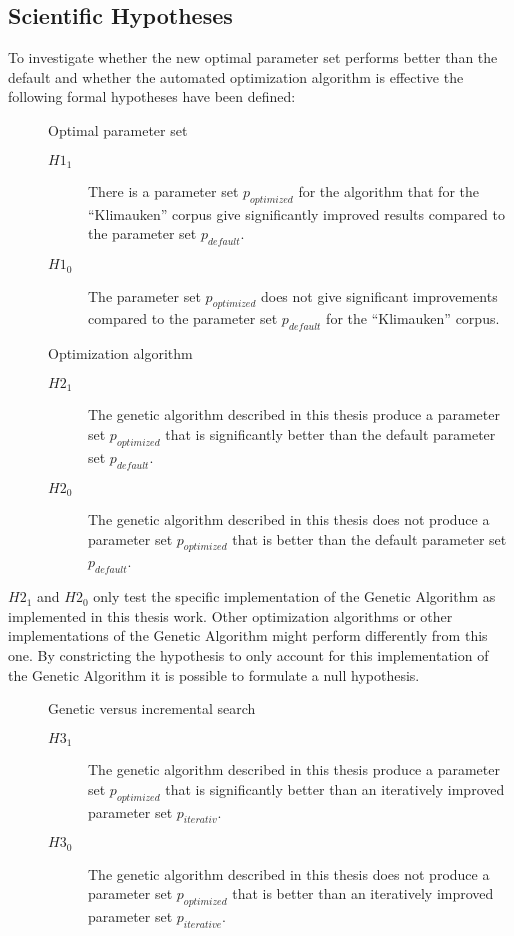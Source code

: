 \subsection{Scientific Hypotheses}

To investigate whether the new optimal parameter set performs better than the default and whether the automated optimization algorithm is effective the following formal hypotheses have been defined:


\begin{description}
	\item []Optimal parameter set
	\begin{description}
	\item [\(H1_{1}\)] There is a parameter set \(p_{optimized}\) for the \CTC algorithm that for the ``Klimauken'' corpus give significantly improved results compared to the parameter set \(p_{default}\).
	\item [\(H1_{0}\)] The parameter set \(p_{optimized}\) does not give significant improvements compared to the parameter set \(p_{default}\) for the ``Klimauken'' corpus.
	\end{description}
\end{description}

\begin{description}
	\item []Optimization algorithm
	\begin{description}
	\item [\(H2_{1}\)] The genetic algorithm described in this thesis produce a parameter set \(p_{optimized}\) that is significantly better than the default parameter set \(p_{default}\).
	\item [\(H2_{0}\)] The genetic algorithm described in this thesis does not produce a parameter set \(p_{optimized}\) that is better than the default parameter set \(p_{default}\).
	\end{description}
\end{description}

\(H2_{1}\) and \(H2_{0}\) only test the specific implementation of the Genetic Algorithm as implemented in this thesis work. Other optimization algorithms or other implementations of the Genetic Algorithm might perform differently from this one. By constricting the hypothesis to only account for this implementation of the Genetic Algorithm it is possible to formulate a null hypothesis.

\begin{description}
	\item []Genetic versus incremental search
	\begin{description}
	\item [\(H3_{1}\)] The genetic algorithm described in this thesis produce a parameter set \(p_{optimized}\) that is significantly better than an iteratively improved parameter set \(p_{iterativ}\).
	\item [\(H3_{0}\)] The genetic algorithm described in this thesis does not produce a parameter set \(p_{optimized}\) that is better than an iteratively improved parameter set \(p_{iterative}\).
	\end{description}
\end{description}

